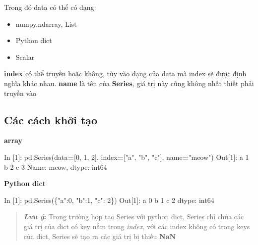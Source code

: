 \documentclass[
]{book}
\newenvironment{Shaded}{\begin{snugshade}}{\end{snugshade}}
\newcommand{\DecValTok}[1]{\textcolor[rgb]{0.00,0.00,0.81}{#1}}
\newcommand{\NormalTok}[1]{#1}
\newcommand{\OperatorTok}[1]{\textcolor[rgb]{0.81,0.36,0.00}{\textbf{#1}}}
\newcommand{\StringTok}[1]{\textcolor[rgb]{0.31,0.60,0.02}{#1}}
\begin{document}
Trong đó data có thể có dạng:

\begin{itemize}
\item
  numpy.ndarray, List
\item
  Python dict
\item
  Scalar
\end{itemize}

\textbf{index} có thể truyền hoặc không, tùy vào dạng của data mà index sẽ được định nghĩa khác nhau.
\textbf{name} là tên của \textbf{Series}, giá trị này cũng không nhất thiết phải truyền vào

\hypertarget{cuxe1c-cuxe1ch-khux1edfi-tux1ea1o}{%
\subsection*{Các cách khởi tạo}\label{cuxe1c-cuxe1ch-khux1edfi-tux1ea1o}}

\textbf{array}

\begin{Shaded}
\begin{Highlighting}[]
\NormalTok{In [}\DecValTok{1}\NormalTok{]: pd.Series(data}\OperatorTok{=}\NormalTok{[}\DecValTok{0}\NormalTok{, }\DecValTok{1}\NormalTok{, }\DecValTok{2}\NormalTok{], index}\OperatorTok{=}\NormalTok{[}\StringTok{"a"}\NormalTok{, }\StringTok{"b"}\NormalTok{, }\StringTok{"c"}\NormalTok{], name}\OperatorTok{=}\StringTok{"meow"}\NormalTok{)}
\NormalTok{Out[}\DecValTok{1}\NormalTok{]: }
\NormalTok{a   }\DecValTok{1}
\NormalTok{b   }\DecValTok{2}
\NormalTok{c   }\DecValTok{3}
\NormalTok{Name: meow,  dtype: int64}
\end{Highlighting}
\end{Shaded}

\textbf{Python dict}

\begin{Shaded}
\begin{Highlighting}[]
\NormalTok{In [}\DecValTok{1}\NormalTok{]: pd.Series(\{}\StringTok{"a"}\NormalTok{:}\DecValTok{0}\NormalTok{, }\StringTok{"b"}\NormalTok{:}\DecValTok{1}\NormalTok{, }\StringTok{"c"}\NormalTok{: }\DecValTok{2}\NormalTok{\})}
\NormalTok{Out[}\DecValTok{1}\NormalTok{]: }
\NormalTok{a    }\DecValTok{0}
\NormalTok{b    }\DecValTok{1}
\NormalTok{c    }\DecValTok{2}
\NormalTok{dtype: int64}
\end{Highlighting}
\end{Shaded}

\begin{quote}
\textbf{\emph{Lưu ý}: } Trong trường hợp tạo Series với python dict, Series chỉ chứa các giá trị của dict có key nằm trong \emph{index}, với các index không có trong keys của dict, Series sẽ tạo ra các giá trị bị thiếu \textbf{NaN}
\end{quote}
\end{document}
